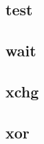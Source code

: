 \documentclass[a4paper,left=2.5cm,right=2.5cm,11pt]{article}
\begin{document}
\subsection{test}
\subsection{wait}
\subsection{xchg}
\subsection{xor}
\end{document}
